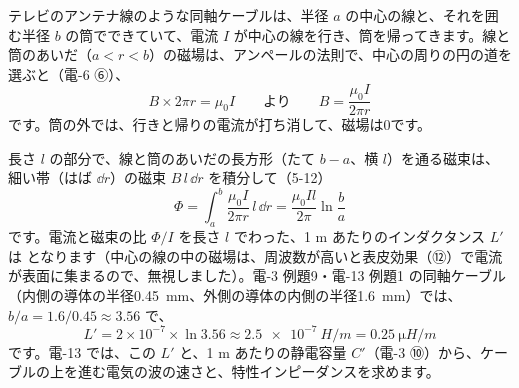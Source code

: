 \label{ph:電-8:coax}\noindent\begin{minipage}[c]{0.66\linewidth}\raggedright
テレビのアンテナ線のような同軸ケーブルは、半径 $a$ の中心の線と、それを囲む半径 $b$ の筒でできていて、電流 $I$ が中心の線を行き、筒を帰ってきます。線と筒のあいだ（$a<r<b$）の磁場は、アンペールの法則で、中心の周りの円の道を選ぶと（電-6 ⑥）、
\[ B\times2\pi r=\mu_0I\qquad\text{より}\qquad B=\frac{\mu_0I}{2\pi r} \]
です。筒の外では、行きと帰りの電流が打ち消して、磁場は0です。
\end{minipage}\hfill
\begin{minipage}[c]{0.31\linewidth}\centering
{}
\end{minipage}
\par\vspace{3pt}
長さ $l$ の部分で、線と筒のあいだの長方形（たて $b-a$、横 $l$）を通る磁束は、細い帯（はば $\dd r$）の磁束 $B\,l\,\dd r$ を積分して（5-12）
\[ \Phi=\int_a^b\frac{\mu_0I}{2\pi r}\,l\,\dd r=\frac{\mu_0Il}{2\pi}\ln\frac{b}{a} \]
です。電流と磁束の比 $\Phi/I$ を長さ $l$ でわった、1 m あたりのインダクタンス $L'$ は
となります（中心の線の中の磁場は、周波数が高いと表皮効果（⑫）で電流が表面に集まるので、無視しました）。電-3 例題9・電-13 例題1 の同軸ケーブル（内側の導体の半径\qty{0.45}{mm}、外側の導体の内側の半径\qty{1.6}{mm}）では、$b/a=1.6/0.45\approx3.56$ で、
\[ L'=2\times10^{-7}\times\ln3.56\approx\qty{2.5e-7}{H/m}=\qty{0.25}{\micro H/m} \]
です。電-13 では、この $L'$ と、1 m あたりの静電容量 $C'$（電-3 ⑩）から、ケーブルの上を進む電気の波の速さと、特性インピーダンスを求めます。

